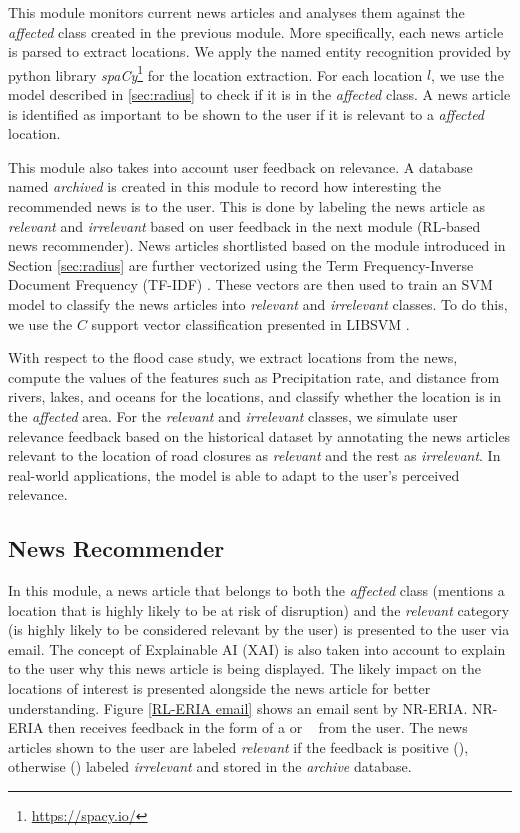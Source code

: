 \documentclass[]{ceurart}
\newcommand{\cmark}{\ding{51}}
\newcommand{\xmark}{\ding{55}}
\begin{document}
This module monitors current news articles and analyses them against the \emph{affected} class created in the previous module. More specifically, each news article is parsed to extract locations. We apply the named entity recognition provided by python library \textit{spaCy}\footnote{\url{https://spacy.io/}} for the location extraction. For each location $l$, we use the model described in \ref{sec:radius} to check if it is in the \emph{affected} class. A news article is identified as important to be shown to the user if it is relevant to a \textit{affected} location.

This module also takes into account user feedback on relevance. A database named \emph{archived} is created in this module to record how interesting the recommended news is to the user. This is done by labeling the news article as \emph{relevant} and \emph{irrelevant} based on user feedback in the next module (RL-based news recommender). News articles shortlisted based on the module introduced in Section \ref{sec:radius} are further vectorized using the Term Frequency-Inverse Document Frequency (TF-IDF) \cite{sammut2011encyclopedia}. 
These vectors are then used to train an SVM model to classify the news articles into \textit{relevant} and \textit{irrelevant} classes. To do this, we use the $C$ support vector classification presented in LIBSVM \cite{chang2011libsvm}. 

With respect to the flood case study, we extract locations from the news, compute the values of the features such as Precipitation rate, and distance from rivers, lakes, and oceans for the locations, and classify whether the location is in the \textit{affected} area.
For the \textit{relevant} and \textit{irrelevant} classes, we simulate user relevance feedback based on the historical dataset by annotating the news articles relevant to the location of road closures as \textit{relevant} and the rest as \textit{irrelevant}. In real-world applications, the model is able to adapt to the user's perceived relevance. 

\subsection {News Recommender}

In this module, a news article that belongs to both the \emph{affected} class (mentions a location that is highly likely to be at risk of disruption) and the \emph{relevant} category (is highly likely to be considered relevant by the user) is presented to the user via email. The concept of Explainable AI (XAI) \cite{gunning2019xai} is also taken into account to explain to the user why this news article is being displayed. The likely impact on the locations of interest is presented alongside the news article for better understanding. Figure \ref{RL-ERIA email} shows an email sent by NR-ERIA. NR-ERIA then receives feedback in the form of a \cmark or \xmark~ from the user. The news articles shown to the user are labeled \emph{relevant} if the feedback is positive (\cmark), otherwise (\xmark) labeled \emph{irrelevant} and stored in the \emph{archive} database.
\end{document}
